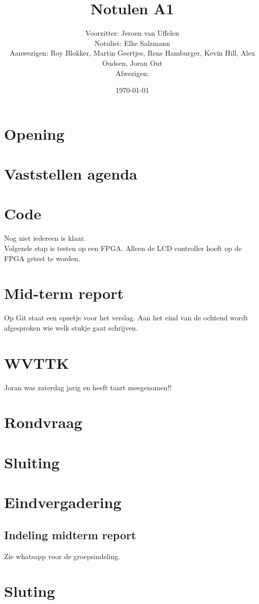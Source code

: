 \documentclass[11pt,twoside,a4paper]{article}
\title{Notulen A1}
\author{
Voorzitter: Jeroen van Uffelen\\
Notulist: Elke Salzmann\\
Aanwezigen: Roy Blokker, Martin Geertjes, Rens Hamburger, Kevin Hill, Alex Oudsen, Joran Out\\
Afwezigen:\\
}
\date{\today}
\begin{document}
\maketitle

\section{Opening}

\section{Vaststellen agenda}

\section{Code}
Nog niet iedereen is klaar.\\
Volgende stap is testen op een FPGA. Alleen de LCD controller hoeft op de FPGA getest te worden. 

\section{Mid-term report}
Op Git staat een opzetje voor het verslag. Aan het eind van de ochtend wordt afgesproken wie welk stukje gaat schrijven. 

\section{WVTTK}
Joran was zaterdag jarig en heeft taart meegenomen!!

\section{Rondvraag}

\section{Sluiting}

\section{Eindvergadering}

\subsection{Indeling midterm report}
Zie whatsapp voor de groepsindeling.

\section{Sluting}
\end{document}
